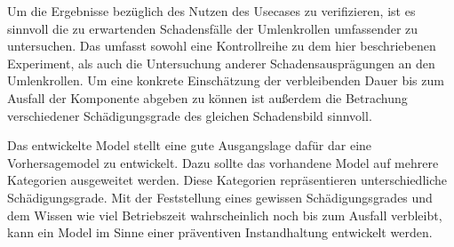 Um die Ergebnisse bezüglich des Nutzen des Usecases zu verifizieren, ist es sinnvoll die zu erwartenden Schadensfälle der Umlenkrollen umfassender zu untersuchen. Das umfasst sowohl eine Kontrollreihe zu dem hier beschriebenen Experiment, als auch die Untersuchung anderer Schadensausprägungen an den Umlenkrollen. Um eine konkrete Einschätzung der verbleibenden Dauer bis zum Ausfall der Komponente abgeben zu können ist außerdem die Betrachung verschiedener Schädigungsgrade des gleichen Schadensbild sinnvoll. 

Das entwickelte Model stellt eine gute Ausgangslage dafür dar eine Vorhersagemodel zu entwickelt. Dazu sollte das vorhandene Model auf mehrere Kategorien ausgeweitet werden. Diese Kategorien repräsentieren unterschiedliche Schädigungsgrade. Mit der Feststellung eines gewissen Schädigungsgrades und dem Wissen wie viel Betriebszeit wahrscheinlich noch bis zum Ausfall verbleibt, kann ein Model im Sinne einer präventiven Instandhaltung entwickelt werden.